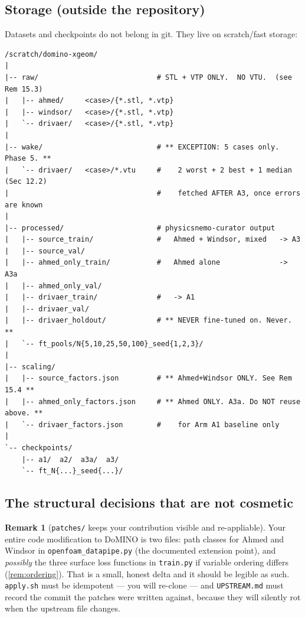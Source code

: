 \documentclass[10pt,a4paper]{article}
\theoremstyle{definition}
\newtheorem{remark}{Remark}[section]
\begin{document}
\subsection{Storage (outside the repository)}

Datasets and checkpoints do not belong in git. They live on scratch/fast storage:

\begin{lstlisting}[style=sh]
/scratch/domino-xgeom/
|
|-- raw/                            # STL + VTP ONLY.  NO VTU.  (see Rem 15.3)
|   |-- ahmed/     <case>/{*.stl, *.vtp}
|   |-- windsor/   <case>/{*.stl, *.vtp}
|   `-- drivaer/   <case>/{*.stl, *.vtp}
|
|-- wake/                           # ** EXCEPTION: 5 cases only. Phase 5. **
|   `-- drivaer/   <case>/*.vtu     #    2 worst + 2 best + 1 median (Sec 12.2)
|                                   #    fetched AFTER A3, once errors are known
|
|-- processed/                      # physicsnemo-curator output
|   |-- source_train/               #   Ahmed + Windsor, mixed   -> A3
|   |-- source_val/
|   |-- ahmed_only_train/           #   Ahmed alone              -> A3a
|   |-- ahmed_only_val/
|   |-- drivaer_train/              #   -> A1
|   |-- drivaer_val/
|   |-- drivaer_holdout/            # ** NEVER fine-tuned on. Never. **
|   `-- ft_pools/N{5,10,25,50,100}_seed{1,2,3}/
|
|-- scaling/
|   |-- source_factors.json         # ** Ahmed+Windsor ONLY. See Rem 15.4 **
|   |-- ahmed_only_factors.json     # ** Ahmed ONLY. A3a. Do NOT reuse above. **
|   `-- drivaer_factors.json        #    for Arm A1 baseline only
|
`-- checkpoints/
    |-- a1/  a2/  a3a/  a3/
    `-- ft_N{...}_seed{...}/
\end{lstlisting}

\subsection{The structural decisions that are not cosmetic}

\begin{remark}[\texttt{patches/} keeps your contribution visible and re-appliable]
\label{rem:patches}
Your entire code modification to DoMINO is two files: path classes for Ahmed and
Windsor in \texttt{openfoam\_datapipe.py} (the documented extension point), and
\emph{possibly} the three surface loss functions in \texttt{train.py} if variable
ordering differs (\cref{rem:ordering}). That is a small, honest delta and it should be
legible as such. \texttt{apply.sh} must be idempotent --- you will re-clone --- and
\texttt{UPSTREAM.md} must record the commit the patches were written against, because
they will silently rot when the upstream file changes.
\end{remark}
\end{document}
